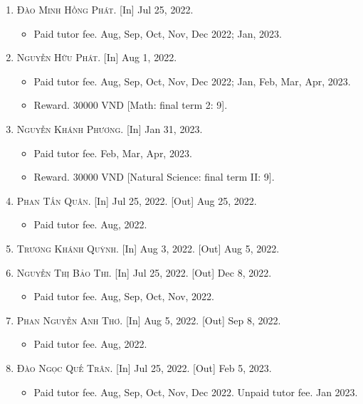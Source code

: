 \documentclass{article}
\begin{document}
\begin{enumerate}
\begin{itemize}
	\end{itemize}
	\item \textsc{Đào Minh Hồng Phát.} \textsf{[In]} Jul 25, 2022.
	\begin{itemize}
		\item \textsf{Paid tutor fee.} Aug, Sep, Oct, Nov, Dec 2022; Jan, 2023.
	\end{itemize}
	\item \textsc{Nguyễn Hữu Phát.} \textsf{[In]} Aug 1, 2022.
	\begin{itemize}
		\item \textsf{Paid tutor fee.} Aug, Sep, Oct, Nov, Dec 2022; Jan, Feb, Mar, Apr, 2023.
		\item \textsf{Reward.} 30000 VND [Math: final term 2: 9].
	\end{itemize}
	\item \textsc{Nguyễn Khánh Phương.}  \textsf{[In]} Jan 31, 2023.
	\begin{itemize}
		\item \textsf{Paid tutor fee.} Feb, Mar, Apr, 2023.
		\item \textsf{Reward.} 30000 VND [Natural Science: final term II: 9].
	\end{itemize}
	\item \textsc{Phan Tấn Quân.} \textsf{[In]} Jul 25, 2022. \textsf{[Out]} Aug 25, 2022.
	\begin{itemize}
		\item \textsf{Paid tutor fee.} Aug, 2022.
	\end{itemize}
	\item \textsc{Trương Khánh Quỳnh.} \textsf{[In]} Aug 3, 2022. \textsf{[Out]} Aug 5, 2022.
	\item \textsc{Nguyễn Thị Bảo Thi.} \textsf{[In]} Jul 25, 2022. \textsf{[Out]} Dec 8, 2022.
	\begin{itemize}
		\item \textsf{Paid tutor fee.} Aug, Sep, Oct, Nov, 2022.
	\end{itemize}
	\item \textsc{Phan Nguyễn Anh Thơ.} \textsf{[In]} Aug 5, 2022. \textsf{[Out]} Sep 8, 2022.
	\begin{itemize}
		\item \textsf{Paid tutor fee.} Aug, 2022.
	\end{itemize}
	\item \textsc{Đào Ngọc Quế Trân.} \textsf{[In]} Jul 25, 2022. \textsf{[Out]} Feb 5, 2023.
	\begin{itemize}
		\item \textsf{Paid tutor fee.} Aug, Sep, Oct, Nov, Dec 2022. \textsf{Unpaid tutor fee.} Jan 2023.

\end{itemize}
\end{enumerate}
\end{document}
